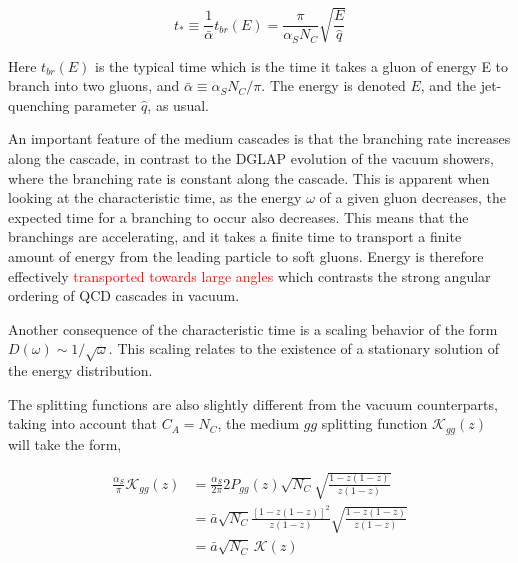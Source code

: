 \documentclass[main.tex]{subfiles}
\begin{document}
\begin{equation}\label{eqn: characteristic_time}
    t_* \equiv \frac{1}{\bar \alpha} t_{br}(E) = \frac{\pi}{\alpha_S N_C} \sqrt{\frac{E}{\hat q}}
\end{equation}

Here \(t_{br}(E)\) is the typical time which is the time it takes a gluon of energy E to branch into two gluons, and \(\bar \alpha \equiv \alpha_S N_C / \pi\). The energy is denoted \(E\), and the jet-quenching parameter \(\hat q\), as usual.

An important feature of the medium cascades is that the branching rate increases along the cascade, in contrast to the DGLAP evolution of the vacuum showers, where the branching rate is constant along the cascade. This is apparent when looking at the characteristic time, as the energy \(\omega\) of a given gluon decreases, the expected time for a branching to occur also decreases. This means that the branchings are accelerating, and it takes a finite time to transport a finite amount of energy from the leading particle to soft gluons. Energy is therefore effectively \textcolor{red}{transported towards large angles} which contrasts the strong angular ordering of QCD cascades in vacuum.

Another consequence of the characteristic time is a scaling behavior of the form \(D(\omega) \sim 1/\sqrt{\omega} \). This scaling relates to the existence of a stationary solution of the energy distribution. 


The splitting functions are also slightly different from the vacuum counterparts, taking into account that \(C_A=N_C\), the medium \(gg\) splitting function \(\mathcal{K}_{gg}(z)\) will take the form, 

\begin{align}\label{eqn: vacuumtomedium_ggg_splitting_relation}
    \frac{\alpha_S}{\pi} \mathcal{K}_{gg}(z) &= \frac{\alpha_S}{2 \pi} 2 P_{gg}(z) \sqrt{N_C} \sqrt{\frac{1-z(1-z)}{z(1-z)}} \nonumber \\
    &= \bar a \sqrt{N_C} \frac{\left[1-z(1-z)\right]^2}{z(1-z)}  \sqrt{\frac{1-z(1-z)}{z(1-z)}} \nonumber \\
    &= \bar a \sqrt{N_C} \, \mathcal{K}(z)
\end{align}
\end{document}
